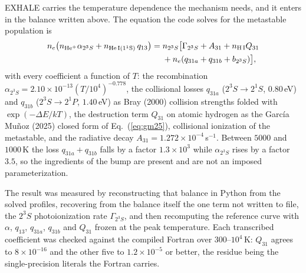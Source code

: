 \documentclass[english,a4paper]{my_memo}
\begin{document}
EXHALE carries the temperature dependence the mechanism needs, and it enters
in the balance written above. The equation the code solves for the metastable
population is
%
\begin{equation}
\begin{split}
n_e\bigl(n_{\rm He^+}\alpha_{2^3S} + n_{\rm He\,I(1^1S)}\,q_{13}\bigr)
 = \; & n_{2^3S}\bigl[\Gamma_{2^3S} + A_{31} + n_{\rm H\,I}Q_{31} \\
      & + n_e(q_{31a}+q_{31b}+b_{2^3S})\bigr],
\end{split}
\end{equation}
%
with every coefficient a function of $T$: the recombination
$\alpha_{2^3S} = 2.10\times 10^{-13}(T/10^4)^{-0.778}$, the collisional
losses $q_{31a}$ ($2^3S \rightarrow 2^1S$, $0.80$\,eV) and $q_{31b}$
($2^3S \rightarrow 2^1P$, $1.40$\,eV) as Bray (2000) collision strengths
folded with $\exp(-\Delta E/kT)$, the destruction term $Q_{31}$ on atomic
hydrogen as the Garc\'ia Mu\~noz (2025) closed form of
Eq.~(\ref{eq:gm25}), collisional ionization of the metastable, and the
radiative decay $A_{31} = 1.272\times10^{-4}$\,s$^{-1}$. Between $5000$ and
$1000$\,K the loss $q_{31a}+q_{31b}$ falls by a factor $1.3\times 10^{3}$
while $\alpha_{2^3S}$ rises by a factor $3.5$, so the ingredients of the bump
are present and are not an imposed parameterization.

The result was measured by reconstructing that balance in Python from the
solved profiles, recovering from the balance itself the one term not written
to file, the $2^3S$ photoionization rate $\Gamma_{2^3S}$, and then
recomputing the reference curve with $\alpha$, $q_{13}$, $q_{31a}$, $q_{31b}$
and $Q_{31}$ frozen at the peak temperature. Each transcribed coefficient was
checked against the compiled Fortran over $300$--$10^4$\,K: $Q_{31}$ agrees
to $8\times10^{-16}$ and the other five to $1.2\times10^{-5}$ or better, the
residue being the single-precision literals the Fortran carries.
\end{document}
